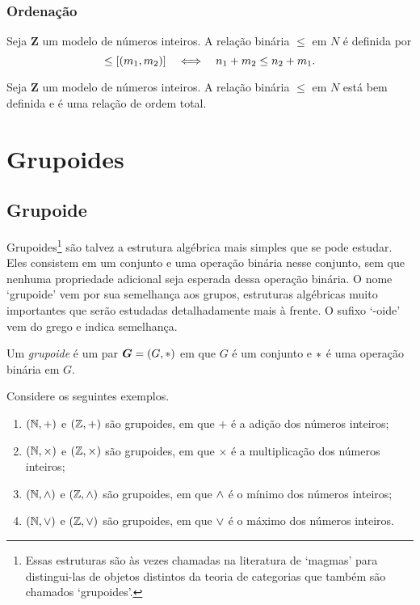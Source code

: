 \subsubsection{Ordenação}

\begin{definition}
	Seja $\bm Z$ um modelo de números inteiros. A relação binária $\leq$ em $N$ é definida por
	\begin{equation*}
	[(n_1,n_2)] \leq [(m_1,m_2)] \sse n_1+m_2 \leq n_2+m_1.
	\end{equation*}
\end{definition}

\begin{exercise}
	Seja $\bm Z$ um modelo de números inteiros. A relação binária $\leq$ em $N$ está bem definida e é uma relação de ordem total.
\end{exercise}


\section{Grupoides}

\subsection{Grupoide}

Grupoides\footnote{Essas estruturas são às vezes chamadas na literatura de `magmas' para distingui-las de objetos distintos da teoria de categorias que também são chamados `grupoides'.} são talvez a estrutura algébrica mais simples que se pode estudar. Eles consistem em um conjunto e uma operação binária nesse conjunto, sem que nenhuma propriedade adicional seja esperada dessa operação binária. O nome `grupoide' vem por sua semelhança aos grupos, estruturas algébricas muito importantes que serão estudadas detalhadamente mais à frente. O sufixo `-oide' vem do grego e indica semelhança.

\begin{definition}
Um \emph{grupoide} é um par $\bm G=(G,\ast)$ em que $G$ é um conjunto e $\ast$ é uma operação binária em $G$.
\end{definition}

\begin{example}
Considere os seguintes exemplos.
	\begin{enumerate}
	\item $(\mathbb{N},+)$ e $(\mathbb{Z},+)$ são grupoides, em que $+$ é a adição dos números inteiros;
	\item $(\mathbb{N},\times)$ e $(\mathbb{Z},\times)$ são grupoides, em que $\times$ é a multiplicação dos números inteiros;
	\item $(\mathbb{N},\mathbin{\wedge})$ e $(\mathbb{Z},\mathbin{\wedge})$ são grupoides, em que $\mathbin{\wedge}$ é o mínimo dos números inteiros;
	\item $(\mathbb{N},\mathbin{\vee})$ e $(\mathbb{Z},\mathbin{\vee})$ são grupoides, em que $\mathbin{\vee}$ é o máximo dos números inteiros.
	\end{enumerate}
\end{example}

